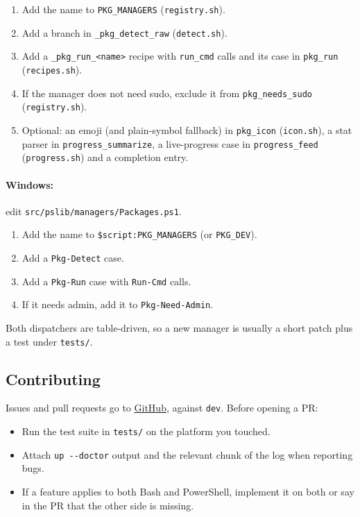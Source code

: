 \documentclass[11pt,a4paper]{article}
\begin{document}
\begin{enumerate}
  \item Add the name to \texttt{PKG\_MANAGERS} (\texttt{registry.sh}).
  \item Add a branch in \texttt{\_pkg\_detect\_raw} (\texttt{detect.sh}).
  \item Add a \texttt{\_pkg\_run\_<name>} recipe with \texttt{run\_cmd}
        calls and its case in \texttt{pkg\_run} (\texttt{recipes.sh}).
  \item If the manager does not need sudo, exclude it from
        \texttt{pkg\_needs\_sudo} (\texttt{registry.sh}).
  \item Optional: an emoji (and plain-symbol fallback) in
        \texttt{pkg\_icon} (\texttt{icon.sh}), a stat parser in
        \texttt{progress\_summarize}, a live-progress case in
        \texttt{progress\_feed} (\texttt{progress.sh}) and a completion entry.
\end{enumerate}

\paragraph{Windows:} edit \texttt{src/pslib/managers/Packages.ps1}.

\begin{enumerate}
  \item Add the name to \texttt{\$script:PKG\_MANAGERS} (or
        \texttt{PKG\_DEV}).
  \item Add a \texttt{Pkg-Detect} case.
  \item Add a \texttt{Pkg-Run} case with \texttt{Run-Cmd} calls.
  \item If it needs admin, add it to \texttt{Pkg-Need-Admin}.
\end{enumerate}

Both dispatchers are table-driven, so a new manager is usually a short
patch plus a test under \texttt{tests/}.

\subsection{Contributing}
Issues and pull requests go to
\href{https://github.com/MasterCruelty/eMerger}{GitHub}, against
\texttt{dev}. Before opening a PR:

\begin{itemize}
  \item Run the test suite in \texttt{tests/} on the platform you
        touched.
  \item Attach \texttt{up -{}-doctor} output and the relevant chunk of the
        log when reporting bugs.
  \item If a feature applies to both Bash and PowerShell, implement it on
        both or say in the PR that the other side is missing.
\end{itemize}
\end{document}
